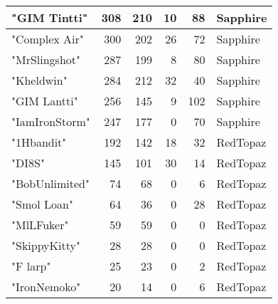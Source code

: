 \documentclass{article}
\begin{document}
\begin{table}[htbp]
\begin{tabular}{|l|r|r|r|r|l|}
"GIM Tintti" & 308 & 210 & 10 & 88 & Sapphire \\ \hline
"Complex Air" & 300 & 202 & 26 & 72 & Sapphire \\ \hline
"MrSlingshot" & 287 & 199 & 8 & 80 & Sapphire \\ \hline
"Kheldwin" & 284 & 212 & 32 & 40 & Sapphire \\ \hline
"GIM Lantti" & 256 & 145 & 9 & 102 & Sapphire \\ \hline
"IamIronStorm" & 247 & 177 & 0 & 70 & Sapphire \\ \hline
"1Hbandit" & 192 & 142 & 18 & 32 & RedTopaz \\ \hline
"DI8S" & 145 & 101 & 30 & 14 & RedTopaz \\ \hline
"BobUnlimited" & 74 & 68 & 0 & 6 & RedTopaz \\ \hline
"Smol Loan" & 64 & 36 & 0 & 28 & RedTopaz \\ \hline
"MlLFuker" & 59 & 59 & 0 & 0 & RedTopaz \\ \hline
"SkippyKitty" & 28 & 28 & 0 & 0 & RedTopaz \\ \hline
"F larp" & 25 & 23 & 0 & 2 & RedTopaz \\ \hline
"IronNemoko" & 20 & 14 & 0 & 6 & RedTopaz \\ \hline
\end{tabular}
\end{table}
\end{document}
